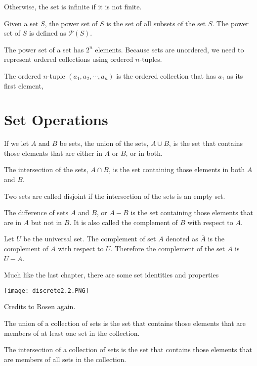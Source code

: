 \documentclass[../discrete.tex]{subfiles}
\begin{document}
Otherwise, the set is infinite if it is not finite.

\begin{definition}
    Given a set $S$, the power set of $S$ is the set of all subsets of the set $S$. The power set of $S$ is defined as $\mathcal{P}(S)$.
\end{definition}

The power set of a set has $2^n$ elements. Because sets are unordered, we need to represent ordered collections using ordered $n$-tuples.
\begin{definition}
    The ordered $n$-tuple $(a_1, a_2,\cdots,a_n)$ is the ordered collection that has $a_1$ as its first element, 
\end{definition}

\section{Set Operations}
If we let $A$ and $B$ be sets, the union of the sets, $A\cup B$, is the set that contains those 
elements that are either in $A$ or $B$, or in both.

The intersection of the sets, $A\cap B$, is the set containing those elements in both $A$ and $B$.

Two sets are called disjoint if the intersection of the sets is an empty set.

The difference of sets $A$ and $B$, or $A-B$ is the set containing those elements that are in $A$ but not in $B$. 
It is also called the complement of $B$ with respect to $A$.

\begin{definition}
    Let $U$ be the universal set. The complement of set $A$ denoted as $\overline{A}$ is the 
    complement of $A$ with respect to $U$. Therefore the complement of the set $A$ is $U-A$.
\end{definition}

Much like the last chapter, there are some set identities and properties
\begin{center}
    \texttt{[image: discrete2.2.PNG]}
\end{center}
Credits to Rosen again.

The union of a collection of sets is the set that contains those elements that are members of at least one set in the collection.

The intersection of a collection of sets is the set that contains those elements that are members of all sets in the collection.
\end{document}
